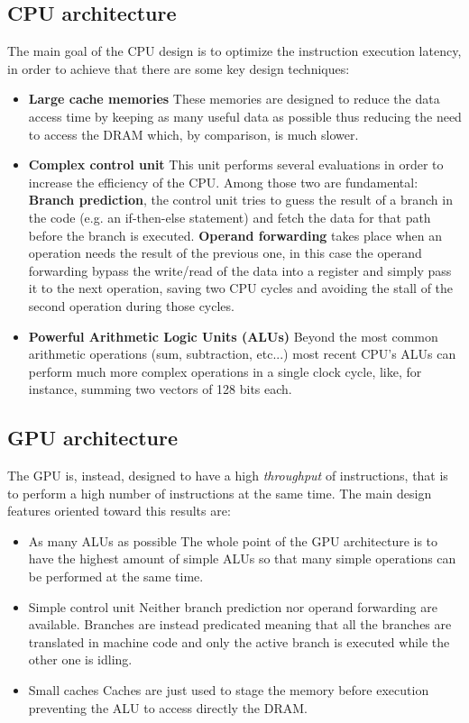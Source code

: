 \subsection{CPU architecture}
The main goal of the CPU design is to optimize the instruction execution latency, in order to achieve that there are some key design techniques:
\begin{itemize}
\item \textbf{Large cache memories} These memories are designed to reduce the data access time by keeping as many useful data as possible thus reducing the need to access the DRAM which, by comparison, is much slower.
\item \textbf{Complex control unit} This unit performs several evaluations in order to increase the efficiency of the CPU. Among those two are fundamental: \textbf{Branch prediction}, the control unit tries to guess the result of a branch in the code (e.g. an if-then-else statement) and fetch the data for that path before the branch is executed. \textbf{Operand forwarding} takes place when an operation needs the result of the previous one, in this case the operand forwarding bypass the write/read of the data into a register and simply pass it to the next operation, saving two CPU cycles and avoiding the stall of the second operation during those cycles.
\item \textbf{Powerful Arithmetic Logic Units (ALUs)} Beyond the most common arithmetic operations (sum, subtraction, etc...) most recent CPU's ALUs can perform much more complex operations in a single clock cycle, like, for instance, summing two vectors of 128 bits each.
\end{itemize}

\subsection{GPU architecture}
The GPU is, instead, designed to have a high \textit{throughput} of instructions, that is to perform a high number of instructions at the same time. The main design features oriented toward this results are:
\begin{itemize}
\item{As many ALUs as possible} The whole point of the GPU architecture is to have the highest amount of simple ALUs so that many simple operations can be performed at the same time.
\item{Simple control unit} Neither branch prediction nor operand forwarding are available. Branches are instead predicated meaning that all the branches are translated in machine code and only the active branch is executed while the other one is idling.
\item{Small caches} Caches are just used to stage the memory before execution preventing the ALU to access directly the DRAM.
\end{itemize}

